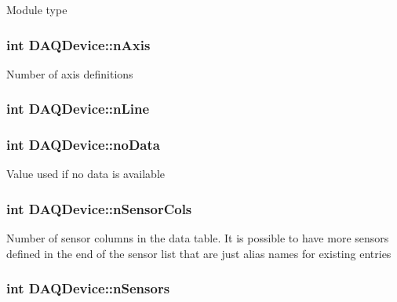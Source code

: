 Module type \hypertarget{classDAQDevice_a9e0cb352d0412ec6cc600cc86aee69b8}{
\subsubsection[{n\-Axis}]{\setlength{\rightskip}{0pt plus 5cm}int D\-A\-Q\-Device\-::n\-Axis\hspace{0.3cm}{\ttfamily [protected]}}}\label{classDAQDevice_a9e0cb352d0412ec6cc600cc86aee69b8}
Number of axis definitions \hypertarget{classDAQDevice_a96c5b196a01603f4b8e37c3840597295}{
\subsubsection[{n\-Line}]{\setlength{\rightskip}{0pt plus 5cm}int D\-A\-Q\-Device\-::n\-Line\hspace{0.3cm}{\ttfamily [protected]}}}\label{classDAQDevice_a96c5b196a01603f4b8e37c3840597295}
\hypertarget{classDAQDevice_af1607d0a9cdd02c6dfe9a7db01fbe4e8}{
\subsubsection[{no\-Data}]{\setlength{\rightskip}{0pt plus 5cm}int D\-A\-Q\-Device\-::no\-Data\hspace{0.3cm}{\ttfamily [protected]}}}\label{classDAQDevice_af1607d0a9cdd02c6dfe9a7db01fbe4e8}
Value used if no data is available \hypertarget{classDAQDevice_a308e077b2ecaff2aa04e3dec7387751a}{
\subsubsection[{n\-Sensor\-Cols}]{\setlength{\rightskip}{0pt plus 5cm}int D\-A\-Q\-Device\-::n\-Sensor\-Cols\hspace{0.3cm}{\ttfamily [protected]}}}\label{classDAQDevice_a308e077b2ecaff2aa04e3dec7387751a}
Number of sensor columns in the data table. It is possible to have more sensors defined in the end of the sensor list that are just alias names for existing entries \hypertarget{classDAQDevice_a66af3e902896059a53f5cfb2fa04e0f5}{
\subsubsection[{n\-Sensors}]{\setlength{\rightskip}{0pt plus 5cm}int D\-A\-Q\-Device\-::n\-Sensors\hspace{0.3cm}{\ttfamily [protected]}}}\label{classDAQDevice_a66af3e902896059a53f5cfb2fa04e0f5}
